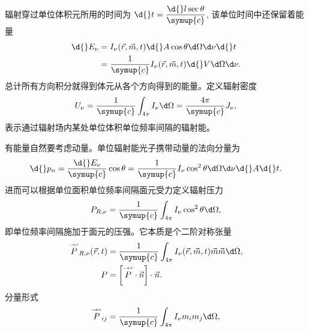 \documentclass[../天体物理基础.tex]{subfiles}
\begin{document}
辐射穿过单位体积元所用的时间为 $\d{}t=\dfrac{\d{}l\sec{\theta}}{\symup{c}}$, 该单位时间中还保留着能量
\begin{align}
\d{}E_{\nu}&=I_{\nu}\mleft(\vec{r},\vec{m}, t\mright)\d{}A\cos{\theta}\d\Omega\d\nu\d{}t\notag\\
&=\frac{1}{\symup{c}}I_{\nu}\mleft(\vec{r},\vec{m}, t\mright)\d{}V\d\Omega\d\nu.
\end{align}
总计所有方向积分就得到体元从各个方向得到的能量。定义辐射密度
\begin{equation}
U_{\nu}=\frac{1}{\symup{c}}\int_{4\pi}I_{\nu}\d\Omega=\frac{4\pi}{\symup{c}}J_{\nu},
\end{equation}
表示通过辐射场内某处单位体积单位频率间隔的辐射能。

有能量自然要考虑动量。单位辐射能光子携带动量的法向分量为
\begin{equation}
\d{}p_{n}=\frac{\d{}E_{\nu}}{\symup{c}}\cos{\theta}=\frac{1}{\symup{c}}I_{\nu}\cos^{2}{\theta}\d\Omega\d\nu\d{}A\d{}t.
\end{equation}
进而可以根据单位面积单位频率间隔面元受力定义辐射压力
\begin{equation}
P_{R,\nu}=\frac{1}{\symup{c}}\int_{4\pi}I_{\nu}\cos^{2}{\theta}\d\Omega,
\end{equation}
即单位频率间隔施加于面元的压强。它本质是个二阶对称张量
\begin{align}
\overset{\rightharpoonup\!\!\!\rightharpoonup}{P}_{R,\nu}\mleft(\vec{r}, t\mright)&=\frac{1}{\symup{c}}\int_{4\pi}I_{\nu}\mleft(\vec{r},\vec{m}, t\mright)\vec{m}\vec{m}\d\Omega,\\
P&=\mleft[\overset{\rightharpoonup\!\!\!\rightharpoonup}P\cdot\vec{n}\mright]\cdot\vec{n}.
\end{align}
分量形式
\begin{equation}
\overset{\rightharpoonup\!\!\!\rightharpoonup}P_{ij}=\frac{1}{\symup{c}}\int_{4\pi}I_{\nu}m_{i}m_{j}\d\Omega,
\end{equation}
\end{document}
